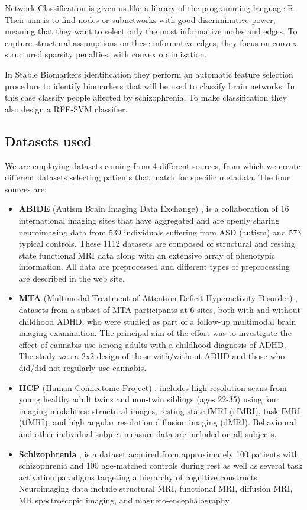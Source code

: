 Network Classification is given us like a library of the programming language R. Their aim is to find nodes or subnetworks with good discriminative power, meaning that they want to select only the most informative nodes and edges. To capture structural assumptions on these informative edges, they focus on convex structured sparsity penalties, with convex optimization. 
\vspace{0.5cm}

In Stable Biomarkers identification they perform an automatic feature selection procedure to identify biomarkers that will be used to classify brain networks. In this case classify people affected by schizophrenia. To make classification they also design a RFE-SVM classifier. 

\subsection{Datasets used}

We are employing datasets coming from 4 different sources, from which we create different datasets selecting patients that match for specific metadata. The four sources are:
\begin{itemize}
	\item \textbf{ABIDE} (Autism Brain Imaging Data Exchange) \cite{Cameron2013TheNB}, is a collaboration of 16 international imaging sites that have aggregated and are openly sharing neuroimaging data from 539 individuals suffering from ASD (autism) and 573 typical controls. These 1112 datasets are composed of structural and resting state functional MRI data along with an extensive array of phenotypic information. All data are preprocessed and different types of preprocessing are described in the web site.
	\item \textbf{MTA} (Multimodal Treatment of Attention Deficit Hyperactivity Disorder) \cite{mta}, datasets from a subset of MTA participants at 6 sites, both with and without childhood ADHD, who were studied as part of a follow-up multimodal brain imaging examination. The principal aim of the effort was to investigate the effect of cannabis use among adults with a childhood diagnosis of ADHD. The study was a 2x2 design of those with/without ADHD and those who did/did not regularly use cannabis.
	\item \textbf{HCP} (Human Connectome Project) \cite{Woolrich2001TemporalAI}, includes high-resolution scans from young healthy adult twins and non-twin siblings (ages 22-35) using four imaging modalities: structural images, resting-state fMRI (rfMRI), task-fMRI (tfMRI), and high angular resolution diffusion imaging (dMRI). Behavioural and other individual subject measure data are included on all subjects. 
	\item \textbf{Schizophrenia} \cite{schizo}, is a dataset acquired from approximately 100 patients with schizophrenia and 100 age-matched controls during rest as well as several task activation paradigms targeting a hierarchy of cognitive constructs. Neuroimaging data include structural MRI, functional MRI, diffusion MRI, MR spectroscopic imaging, and magneto-encephalography.
\end{itemize}

